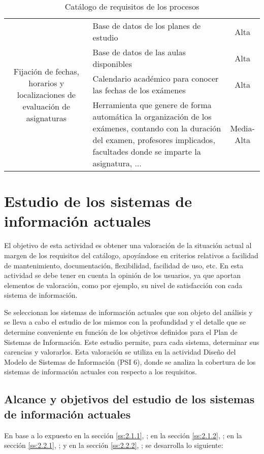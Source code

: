 \documentclass[11pt,a4paper,spanish,twoside]{book}
\begin{document}
\begin{table}[!h]
\begin{tabular}{c|p{5cm}|c}
    \multirow{4}{4cm}{Fijación de fechas, horarios y localizaciones de
      evaluación de asignaturas} 
    & Base de datos de los planes de estudio & Alta \\
    \cline{2-3}
    & Base de datos de las aulas disponibles & Alta \\
    \cline{2-3}
    & Calendario académico para conocer las fechas de los exámenes & Alta \\
    \cline{2-3}
    & Herramienta que genere de forma automática la organización de los
    exámenes, contando con la duración del examen, profesores implicados,
    facultades donde se imparte la asignatura, ... & Media-Alta \\ 
  \end{tabular}
  \caption{Catálogo de requisitos de los procesos} \label{Tab:CatReq}
\end{table}


\chapter{Estudio de los sistemas de información actuales}
El objetivo de esta actividad es obtener una valoración de la situación
actual al margen de los requisitos del catálogo, apoyándose en criterios
relativos a facilidad de mantenimiento, documentación, flexibilidad,
facilidad de uso, etc. En esta actividad se debe tener en cuenta la opinión
de los usuarios, ya que aportan elementos de valoración, como por ejemplo,
su nivel de satisfacción con cada sistema de información. 

Se seleccionan los
sistemas de información actuales que son objeto del análisis y se lleva a
cabo el estudio de los mismos con la profundidad y el detalle que se
determine conveniente en función de los objetivos definidos para el Plan de
Sistemas de Información. Este estudio permite, para cada sistema, determinar
sus carencias y valorarlos. Esta valoración se utiliza en la actividad
Diseño del Modelo de Sistemas de Información (PSI 6), donde se analiza la
cobertura de los sistemas de información actuales con respecto a los
requisitos.

\section{Alcance y objetivos del estudio de los sistemas de 
  información actuales} 
En base a lo expuesto 
en la sección \vref{ss:2.1.1}, \emph{}; 
en la sección \vref{ss:2.1.2}, \emph{}; 
en la sección \vref{ss:2.2.1}, \emph{}; y
en la sección \vref{ss:2.2.2}, \emph{}; 
se desarrolla lo siguiente:
\end{document}

